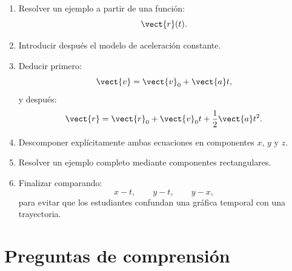 \begin{notapedagogica}
\begin{enumerate}
    \item Resolver un ejemplo a partir de una función:
    \[
    \vect{r}(t).
    \]

    \item Introducir después el modelo de aceleración constante.

    \item Deducir primero:
    \[
    \vect{v}=\vect{v}_0+\vect{a}t,
    \]
    y después:
    \[
    \vect{r}
    =
    \vect{r}_0+\vect{v}_0t+\frac{1}{2}\vect{a}t^2.
    \]

    \item Descomponer explícitamente ambas ecuaciones en componentes \(x\), \(y\)
    y \(z\).

    \item Resolver un ejemplo completo mediante componentes rectangulares.

    \item Finalizar comparando:
    \[
    x-t,\qquad y-t,\qquad y-x,
    \]
    para evitar que los estudiantes confundan una gráfica temporal con una
    trayectoria.
\end{enumerate}
\end{notapedagogica}


\section{Preguntas de comprensión}

